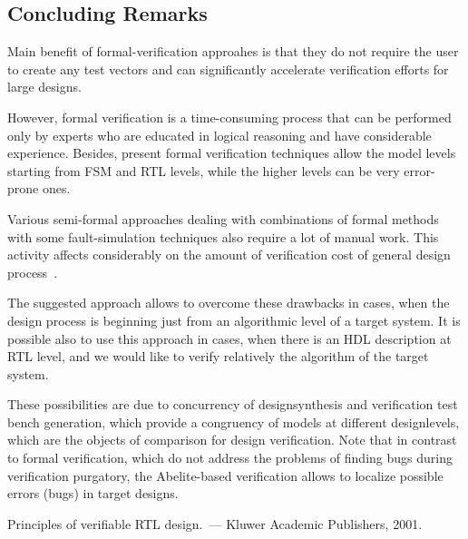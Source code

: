 \begin{multicols}{2}
{}

\vspace*{-9pt}

\section{Concluding Remarks} %

   \noindent
Main benefit of formal-verification approahes  is that  they do not require the user to create any test vectors
and can significantly accelerate verification efforts for large designs.

   However, formal verification is a time-consuming process that can be performed only by experts who are
educated in logical reasoning and have considerable experience. Besides, present formal verification techniques
allow the model levels starting from FSM and RTL levels, while the higher levels can be very error-prone ones.

   Various semi-formal approaches dealing with combinations of formal methods with some fault-simulation
techniques also require a lot of manual work. This activi\-ty affects considerably on the amount of verification
cost of general design process~\cite{3bar}.

   The suggested approach allows to overcome these drawbacks in cases, when the design process is be\-ginning
just from an algorithmic level of a target system. It is possible also to use this approach in cases, when there is
an HDL description at RTL level, and we would like to verify relatively the algorithm of the target system.

   These possibilities are due to concurrency of design\linebreak synthesis and verification test bench generation, which
provide a congruency of models at different design\linebreak levels, which are
the objects of comparison for design
veri\-fi\-cation. Note that in contrast to formal veri\-fi\-cation, which do not address the problems of finding bugs\linebreak
during veri\-fi\-cation purgatory, the Abelite-based verification allows to localize possible errors (bugs) in target
designs.

\vspace*{-9pt}

{\small\frenchspacing
{%
\begin{thebibliography}{99}
Principles of verifiable RTL design.~---  Kluwer Academic Publishers, 2001.


\end{thebibliography}}}
\end{multicols}
